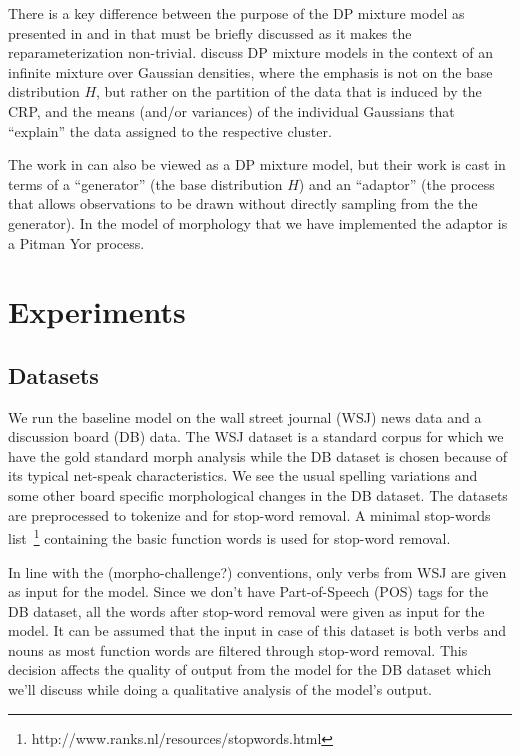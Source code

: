 \documentclass{article}
\begin{document}
There is a key difference between the purpose of the DP mixture model
as presented in \cite{lovell2012} and in \cite{goldwater2011} that
must be briefly discussed as it makes the reparameterization
non-trivial. \cite{lovell2012} discuss DP mixture models in the
context of an infinite mixture over Gaussian densities, where the
emphasis is not on the base distribution $H$, but rather on the
partition of the data that is induced by the CRP, and the means
(and/or variances) of the individual Gaussians that ``explain'' the
data assigned to the respective cluster.

The work in \cite{goldwater2011} can also be viewed as a DP mixture
model, but their work is cast in terms of a ``generator'' (the base
distribution $H$) and an ``adaptor'' (the process that allows
observations to be drawn without directly sampling from the the
generator). In the model of morphology that we have implemented the
adaptor is a Pitman Yor process.

\section{Experiments}
\label{sec:experiments}

\subsection{Datasets}

We run the baseline model on the wall street journal (WSJ) news data 
and a discussion board (DB) data. The WSJ dataset is a standard corpus 
for which we have the gold standard morph analysis while the DB dataset 
is chosen because of its typical net-speak characteristics. We see 
the usual spelling variations and some other board specific morphological
 changes in the DB dataset. The datasets are preprocessed to tokenize 
and for stop-word removal. A minimal stop-words 
list~\footnote{http://www.ranks.nl/resources/stopwords.html} containing 
the basic function words is used for stop-word removal.

In line with the (morpho-challenge?) conventions, only verbs from WSJ 
are given as input for the model. Since we don't have Part-of-Speech (POS)
 tags for the DB dataset, all the words after stop-word removal were 
given as input for the model. It can be assumed that the input in case of 
this dataset is both verbs and nouns as most function words are filtered 
through stop-word removal. This decision affects the quality of output 
from the model for the DB dataset which we'll discuss while doing a 
qualitative analysis of the model's output.
\end{document}

